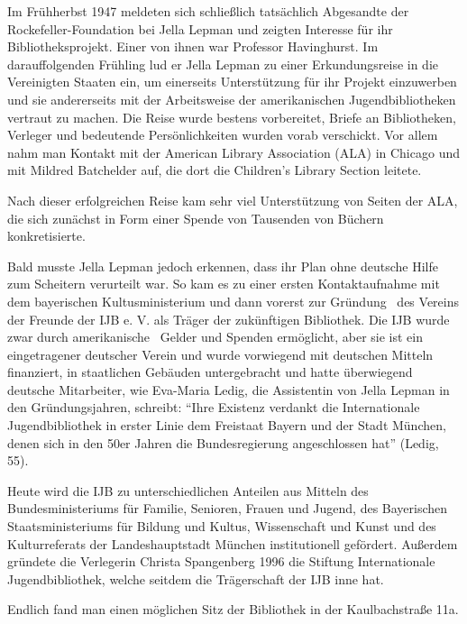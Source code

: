 \documentclass[a4paper,
fontsize=11pt,
oneside,
numbers=noperiodatend,
parskip=half-,
bibliography=totoc,
final
]{scrartcl}
\begin{document}
Im Frühherbst 1947 meldeten sich schließlich tatsächlich Abgesandte der
Rockefeller-Foundation bei Jella Lepman und zeigten Interesse für ihr
Bibliotheksprojekt. Einer von ihnen war Professor Havinghurst. Im
darauffolgenden Frühling lud er Jella Lepman zu einer Erkundungsreise in
die Vereinigten Staaten ein, um einerseits Unterstützung für ihr Projekt
einzuwerben und sie andererseits mit der Arbeitsweise der amerikanischen
Jugendbibliotheken vertraut zu machen. Die Reise wurde bestens
vorbereitet, Briefe an Bibliotheken, Verleger und bedeutende
Persönlichkeiten wurden vorab verschickt. Vor allem nahm man Kontakt mit
der American Library Association (ALA) in Chicago und mit Mildred
Batchelder auf, die dort die Children's Library Section leitete.

Nach dieser erfolgreichen Reise kam sehr viel Unterstützung von Seiten
der ALA, die sich zunächst in Form einer Spende von Tausenden von
Büchern konkretisierte.

Bald musste Jella Lepman jedoch erkennen, dass ihr Plan ohne deutsche
Hilfe zum Scheitern verurteilt war. So kam es zu einer ersten
Kontaktaufnahme mit dem bayerischen Kultusministerium und dann vorerst
zur Gründung~ des Vereins der Freunde der IJB e. V. als Träger der
zukünftigen Bibliothek. Die IJB wurde zwar durch amerikanische~ Gelder
und Spenden ermöglicht, aber sie ist ein eingetragener deutscher Verein
und wurde vorwiegend mit deutschen Mitteln finanziert, in staatlichen
Gebäuden untergebracht und hatte überwiegend deutsche Mitarbeiter, wie
Eva-Maria Ledig, die Assistentin von Jella Lepman in den
Gründungsjahren, schreibt: \enquote{Ihre Existenz verdankt die
Internationale Jugendbibliothek in erster Linie dem Freistaat Bayern und
der Stadt München, denen sich in den 50er Jahren die Bundesregierung
angeschlossen hat} (Ledig, 55).

Heute wird die IJB zu unterschiedlichen Anteilen aus Mitteln des
Bundesministeriums für Familie, Senioren, Frauen und Jugend, des
Bayerischen Staatsministeriums für Bildung und Kultus, Wissenschaft und
Kunst und des Kulturreferats der Landeshauptstadt München institutionell
gefördert. Außerdem gründete die Verlegerin Christa Spangenberg 1996 die
Stiftung Internationale Jugendbibliothek, welche seitdem die
Trägerschaft der IJB inne hat.

Endlich fand man einen möglichen Sitz der Bibliothek in der
Kaulbachstraße 11a.
\end{document}
